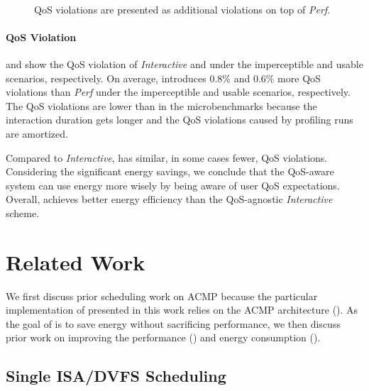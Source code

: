 \begin{figure}[t]
\centering
{}\\
\caption{QoS violations are presented as additional violations on top of \textit{Perf}.}
\label{fig:full_results}
\end{figure}

\paragraph{QoS Violation}  and  show the QoS violation of \textit{Interactive} and \greenweb under the imperceptible and usable scenarios, respectively. On average, \greenweb introduces 0.8\% and 0.6\% more QoS violations than \textit{Perf} under the imperceptible and usable scenarios, respectively. The QoS violations are lower than in the microbenchmarks because the interaction duration gets longer and the QoS violations caused by profiling runs are amortized.

Compared to \textit{Interactive}, \greenweb has similar, in some cases fewer, QoS violations. Considering the significant energy savings, we conclude that the QoS-aware \greenweb system can use energy more wisely by being aware of user QoS expectations. Overall, \greenweb achieves better energy efficiency than the QoS-agnostic \textit{Interactive} scheme.

\section{Related Work}
\label{sec:runtime:related}

We first discuss prior scheduling work on ACMP because the particular implementation of \webrt presented in this work relies on the ACMP architecture (). As the goal of \webrt is to save energy without sacrificing performance, we then discuss prior work on improving the performance () and energy consumption ().

\subsection{Single ISA/DVFS Scheduling}
\label{sec:runtime:related:sched}


